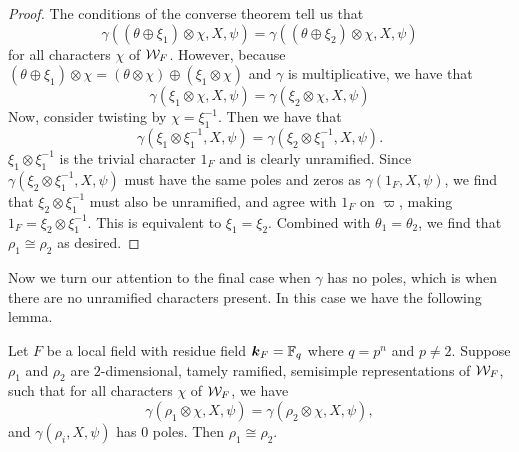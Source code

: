 \begin{proof}
  The conditions of the converse theorem tell us that
  \[ \gamma((\theta \oplus \xi_1) \otimes \chi,X,\psi) = \gamma((\theta \oplus \xi_2) \otimes \chi,X,\psi)\]
  for all characters $\chi$ of $\mathcal{W}_F$.
  However, because $(\theta \oplus \xi_1)\otimes \chi = (\theta \otimes \chi) \oplus (\xi_1 \otimes \chi)$ and $\gamma$ is multiplicative, we have that
  \[\gamma (\xi_1 \otimes \chi,X,\psi) = \gamma(\xi_2 \otimes \chi,X,\psi)\]
  Now, consider twisting by $\chi = \xi_1^{-1}$.
  Then we have that \[\gamma(\xi_1 \otimes \xi_1^{-1},X,\psi) = \gamma(\xi_2 \otimes \xi_1^{-1} , X, \psi).\]
  $\xi_1 \otimes \xi_1^{-1}$ is the trivial character $1_F$ and is clearly unramified.
  Since $\gamma(\xi_2 \otimes \xi_1^{-1}, X, \psi)$ must have the same poles and zeros as $\gamma(1_F, X, \psi)$, we find that $\xi_2 \otimes \xi_1^{-1}$ must also be unramified, and agree with $1_F$ on $\varpi$, making $1_F = \xi_2 \otimes \xi_1^{-1}$.
  This is equivalent to $\xi_1 = \xi_2$.
  Combined with $\theta_1 = \theta_2$, we find that $\rho_1 \cong \rho_2$ as desired.
\end{proof}

Now we turn our attention to the final case when $\gamma$ has no poles, which is when there are no unramified characters present.
In this case we have the following lemma.

\begin{lemma}
  \label{lem:gamma-zero-poles}
  Let $F$ be a local field with residue field $\bm{k}_F = \mathbb{F}_q$ where $q = p^n$ and $p \neq 2$.
  Suppose $\rho_1$ and $\rho_2$ are $2$-dimensional, tamely ramified, semisimple representations of $\mathcal{W}_F$, such that for all characters $\chi$ of $\mathcal{W}_F$, we have
  \[\gamma(\rho_1 \otimes \chi,X,\psi) = \gamma(\rho_2 \otimes \chi,X,\psi),\]
  and $\gamma(\rho_i,X,\psi)$ has $0$ poles.
  Then $\rho_1 \cong \rho_2$.
\end{lemma}

